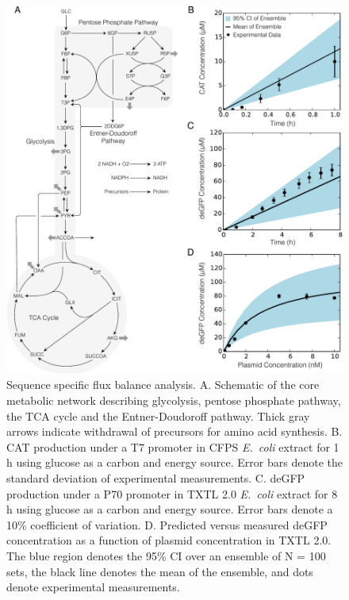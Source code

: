 \documentclass[journal=asbcd6,manuscript=article]{achemso}
\begin{document}
\clearpage

\begin{figure}[t!]
\centering
\includegraphics[width=1.00\textwidth]{./figs/Fig-1-Network-Validation-Simulations.pdf}
\caption{Sequence specific flux balance analysis.
A. Schematic of the core metabolic network describing glycolysis, pentose phosphate pathway, the TCA cycle and the Entner-Doudoroff pathway. Thick gray arrows indicate withdrawal of precursors for amino acid synthesis.
B. CAT production under a T7 promoter in CFPS \textit{E.~coli} extract for 1 h using glucose as a carbon and energy source. Error bars denote the standard deviation of experimental measurements.
C. deGFP production under a P70 promoter in TXTL 2.0 \textit{E.~coli} extract for 8 h using glucose as a carbon and energy source. Error bars denote a 10\% coefficient of variation.
D. Predicted versus measured deGFP concentration as a function of plasmid concentration in TXTL 2.0.
The blue region denotes the 95\% CI over an ensemble of N = 100 sets, the black line denotes the mean of the ensemble, and dots denote experimental measurements.}
\label{fig:network}
\end{figure}

\clearpage
\end{document}

